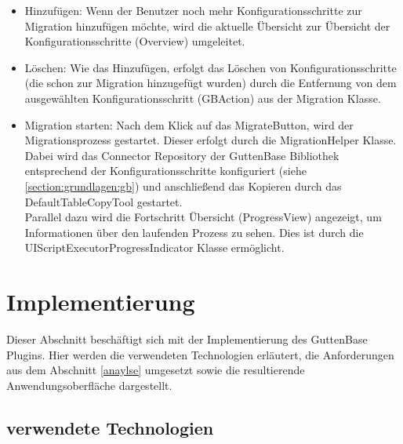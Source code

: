 \begin{itemize}
	\item Hinzufügen: Wenn der Benutzer noch mehr Konfigurationsschritte zur Migration hinzufügen möchte, wird die aktuelle Übersicht zur Übersicht der Konfigurationsschritte (Overview) umgeleitet.
	\item Löschen: Wie das Hinzufügen, erfolgt das Löschen von Konfigurationsschritte (die schon zur Migration hinzugefügt wurden) durch die Entfernung von dem ausgewählten Konfigurationsschritt (GBAction) aus der Migration Klasse. 
	\item Migration starten: Nach dem Klick auf das \glqq Migrate\grqq Button, wird der Migrationsprozess gestartet. Dieser erfolgt durch die MigrationHelper Klasse. Dabei wird das Connector Repository der GuttenBase Bibliothek entsprechend der Konfigurationsschritte konfiguriert (siehe \ref{section:grundlagen:gb}) und anschließend das Kopieren durch das DefaultTableCopyTool gestartet. \\
	Parallel dazu wird die Fortschritt Übersicht (ProgressView) angezeigt, um Informationen über den laufenden Prozess zu sehen. Dies ist durch die UIScriptExecutorProgressIndicator Klasse ermöglicht.
	
\end{itemize}

%


\section{Implementierung}
Dieser Abschnitt beschäftigt sich mit der Implementierung des GuttenBase Plugins. Hier werden die verwendeten Technologien erläutert, die Anforderungen aus dem Abschnitt \ref{anaylse} umgesetzt sowie die resultierende Anwendungsoberfläche dargestellt.
\subsection{verwendete Technologien}
